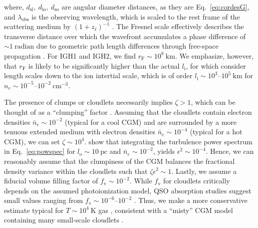 \documentclass[twocolumn, linenumbers, tra]{aastex631}
\begin{document}
\noindent
{where, $d_{\mathrm{sl}},\ d_{\mathrm{lo}},\ d_{\mathrm{so}}$ are angular diameter distances, as they are Eq.~\ref{eq:cordesG}, and $\lambda_{\mathrm{obs}}$ is the observing wavelength, which is scaled to the rest frame of the scattering medium by $(1+z_{\ell})^{-1}$ \citep{Macquart2013}. The Fresnel scale effectively describes the transverse distance over which the wavefront accumulates a phase difference of $ \sim 1\ \mathrm{radian}$ due to geometric path length differences through free-space propagation \citep{Rickett2009}. For IGH1 and IGH2, we find $r_{\mathrm{F}} \sim 10^{8}\ \mathrm{km}$. We emphasize, however, that $r_{\mathrm{F}}$ is likely to be significantly higher than the actual $l_\mathrm{i}$, for which \citet{Ocker2025} consider length scales down to the ion intertial scale, which is of order $l_\mathrm{i} \sim  10^{3}$--$10^{5}\ \mathrm{km}$ for $n_e \sim  10^{-5}$--$10^{-2}\ \mathrm{cm}^{-3}$.

The presence of clumps or cloudlets necessarily implies $\zeta > 1$, which can be thought of as a ``clumping'' factor \citep{Ocker2025}. Assuming that the cloudlets contain electron densities $\bar{n}_e \sim 10^{-2}$ (typical for a cool CGM) and are surrounded by a more tenuous extended medium with electron densities $\bar{n}_e \sim 10^{-4}$ (typical for a hot CGM), we can set $\zeta \sim 10^4$. \citet{Ocker2025} show that integrating the turbulence power spectrum in Eq.~\ref{eq:powspec} for $l_\mathrm{o} \sim 10\ \mathrm{pc}$ and $\bar{n}_e \sim 10^{-2}$, yields $\epsilon^2 \sim 10^{-4}$. Hence, we can reasonably assume that the clumpiness of the CGM balances the fractional density variance within the cloudlets such that $\zeta\epsilon^2 \sim 1$. Lastly, we assume a fiducial volume filling factor of $f_{\mathrm{v}} \sim 10^{-2}$. While $f_{\mathrm{v}}$ for cloudlets critically depends on the assumed photoionization model, QSO absorption studies suggest small values ranging from $f_{\mathrm{v}} \sim 10^{-6}$--$10^{-2}$ \citep{Crighton2013, Prochaska2008, Lau2016}. Thus, we make a more conservative estimate typical for $T \sim 10^{4}\ \mathrm{K}$ gas \citep{Werk2014}, consistent with a ``misty'' CGM model containing many small-scale cloudlets \citep{McCourt2018}. 


}
\end{document}
